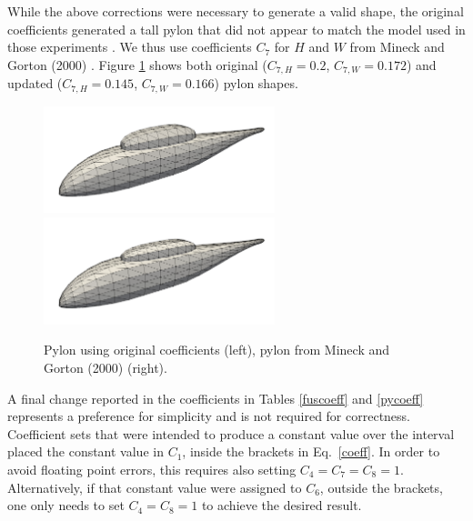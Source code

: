 \documentclass[12pt]{article}
\begin{document}
While the above corrections were necessary to generate a valid shape, the original coefficients generated a 
tall pylon that did not appear to match the model used in those experiments \cite{nasa80051,nasa87762}.
We thus use coefficients $C_{7}$ for $H$ and $W$ from Mineck and Gorton (2000) \cite{mineckgorton}.
Figure \ref{badpylon} shows both original ($C_{7,H} = 0.2$, $C_{7,W} = 0.172$) and
updated ($C_{7,H} = 0.145$, $C_{7,W} = 0.166$) pylon shapes.
\begin{figure} \begin{centering}
\includegraphics[width=2.65in]{img_badpylon.png}
\includegraphics[width=2.65in]{img_good.png}
\caption{Pylon using original coefficients \cite{nasa80051,nasa87762} (left), pylon from Mineck and Gorton (2000) \cite{mineckgorton} (right).}
\label{badpylon}
\end{centering}\end{figure}%

A final change reported in the coefficients in Tables \ref{fuscoeff} and \ref{pycoeff} represents a preference
for simplicity and is not required for correctness.
Coefficient sets that were intended to produce a constant value over the interval placed the constant value in $C_1$,
inside the brackets in Eq.~\ref{coeff}. In order to avoid floating point errors, this requires also setting
$C_4 = C_7 = C_8 = 1$. Alternatively, if that constant value were assigned to $C_6$, outside the brackets, one only
needs to set $C_4 = C_8 = 1$ to achieve the desired result.
\end{document}
